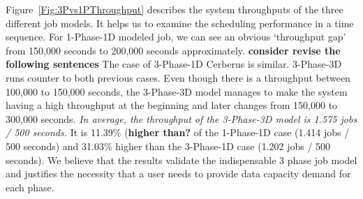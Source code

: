 Figure~\ref{Fig:3Pvs1PThroughput} describes the system throughputs of the three different job models.
It helps us to examine the scheduling performance in a time sequence.
For 1-Phase-1D modeled job, we can see an obvious `throughput gap'
from 150,000 seconds to 200,000 seconds approximately.
\textbf{consider revise the following sentences}
The case of 3-Phase-1D Cerberus is similar.
3-Phase-3D runs counter to both previous cases.
Even though there is a throughput between 100,000 to 150,000 seconds,
the 3-Phase-3D model manages to make the system having a high throughput at the beginning and
later changes from 150,000 to 300,000 seconds.
\textit{In average, the throughput of the 3-Phase-3D model is 1.575 jobs / 500 seconds.}
It is 11.39\% (\textbf{higher than?} of the 1-Phase-1D case (1.414 jobs / 500 seconds) and
31.03\% higher than the 3-Phase-1D case (1.202 jobs / 500 seconds).
We believe that the results validate the indispensable 3 phase job model and
justifies the necessity that a user needs to provide data capacity demand for each phase.



